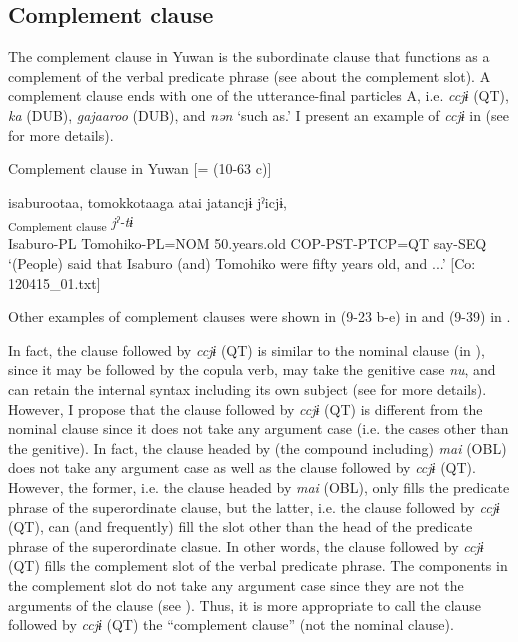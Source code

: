 \subsection{Complement clause}\label{sec:11.1.4}

The complement clause in Yuwan is the subordinate clause that functions as a complement of the verbal predicate phrase (see  about the complement slot). A complement clause ends with one of the utterance-final particles A, i.e. \textit{ccjɨ} (QT), \textit{ka} (DUB), \textit{gajaaroo} (DUB), and \textit{nən} ‘such as.’ I present an example of \textit{ccjɨ} in  (see  for more details).

\ea\label{ex:11-5}  Complement clause in Yuwan [= (10-63 c)]
  
      \glll    isaburootaa,  tomokkotaaga  atai  jatancjɨ   jˀicjɨ,\\
    [\textit{isaburoo-taa}  \textit{tomokko-taa=ga}  \textit{atai}  \textit{jar-tar-n=ccjɨ}]\textsubscript{Complement clause}    \textit{jˀ{}-tɨ}\\
    Isaburo-PL  Tomohiko-PL=NOM  50.years.old  COP-PST-PTCP=QT  say-SEQ\\
    \glt ‘(People) said that Isaburo (and) Tomohiko were fifty years old, and ...’    [Co: 120415\_01.txt]
\z

Other examples of complement clauses were shown in (9-23 b-e) in  and (9-39) in .

In fact, the clause followed by \textit{ccjɨ} (QT) is similar to the nominal clause (in ), since it may be followed by the copula verb, may take the genitive case \textit{nu}, and can retain the internal syntax including its own subject (see  for more details). However, I propose that the clause followed by \textit{ccjɨ} (QT) is different from the nominal clause since it does not take any argument case (i.e. the cases other than the genitive). In fact, the clause headed by (the compound including) \textit{mai} (OBL) does not take any argument case as well as the clause followed by \textit{ccjɨ} (QT). However, the former, i.e. the clause headed by \textit{mai} (OBL), only fills the predicate phrase of the superordinate clause, but the latter, i.e. the clause followed by \textit{ccjɨ} (QT), can (and frequently) fill the slot other than the head of the predicate phrase of the superordinate clasue. In other words, the clause followed by \textit{ccjɨ} (QT) fills the complement slot of the verbal predicate phrase. The components in the complement slot do not take any argument case since they are not the arguments of the clause (see ). Thus, it is more appropriate to call the clause followed by \textit{ccjɨ} (QT) the “complement clause” (not the nominal clause).

